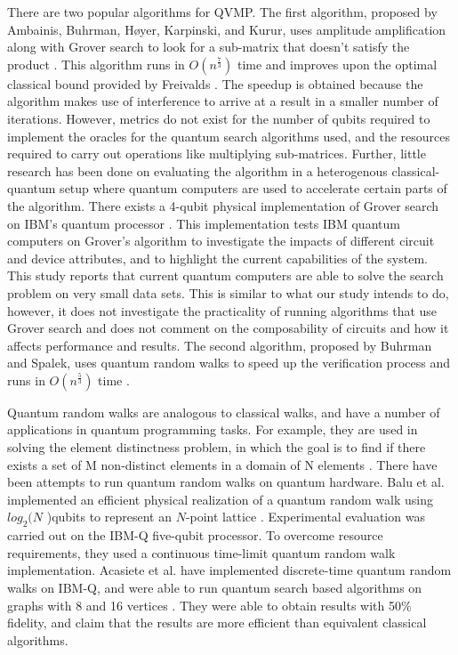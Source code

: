 \documentclass[11pt]{article}
\theoremstyle{definition}
\theoremstyle{remark}
\begin{document}
There are two popular algorithms for QVMP. The first algorithm, proposed by
Ambainis, Buhrman, Høyer, Karpinski, and Kurur, uses amplitude amplification
along with Grover search to look for a sub-matrix that doesn’t satisfy the
product \cite{ambainis_quantum_2002}. This algorithm runs in
$O(n^{\frac{7}{3}})$ time and improves upon the optimal classical bound provided
by Freivalds \cite{freivalds_fast_1979}. The speedup is obtained because the
algorithm makes use of interference to arrive at a result in a smaller number of
iterations. However, metrics do not exist for the number of qubits required to
implement the oracles for the quantum search algorithms used, and the resources
required to carry out operations like multiplying sub-matrices.  Further, little
research has been done on evaluating the algorithm in a heterogenous
classical-quantum setup where quantum computers are used to accelerate certain
parts of the algorithm. There exists a 4-qubit physical implementation of Grover
search on IBM’s quantum processor \cite{mandviwalla_implementing_2018}. This
implementation tests IBM quantum computers on Grover’s algorithm to investigate
the impacts of different circuit and device attributes, and to highlight the
current capabilities of the system.  This study reports that current quantum
computers are able to solve the search problem on very small data sets. This is
similar to what our study intends to do, however, it does not investigate the
practicality of running algorithms that use Grover search and does not comment
on the composability of circuits and how it affects performance and results. The
second algorithm, proposed by Buhrman and Spalek, uses quantum random walks to
speed up the verification process and runs in $O(n^\frac{5}{3})$ time
\cite{buhrman_quantum_2005}.

Quantum random walks are analogous to classical walks, and have a number of
applications in quantum programming tasks. For example, they are used in solving
the element distinctness problem, in which the goal is to find if there exists a
set of M non-distinct elements in a domain of N elements
\cite{ambainis_quantum_2007}. There have been attempts to run quantum random
walks on quantum hardware. Balu et al.  implemented an efficient physical
realization of a quantum random walk using $log_2(N$ )qubits to represent an
$N$-point lattice \cite{balu_physical_2018}.  Experimental evaluation was
carried out on the IBM-Q five-qubit processor. To overcome resource
requirements, they used a continuous time-limit quantum random walk
implementation. Acasiete et al. have implemented discrete-time quantum random
walks on IBM-Q, and were able to run quantum search based algorithms on graphs
with 8 and 16 vertices \cite{acasiete_implementation_2020}. They were able to
obtain results with 50\% fidelity, and claim that the results are more efficient
than equivalent classical algorithms.
\end{document}
